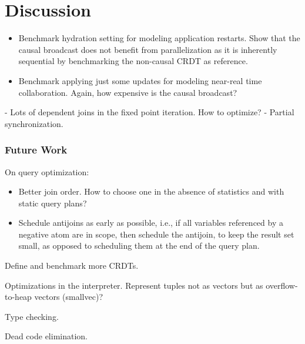 
\chapter{Discussion}\label{ch:discussion}

\begin{itemize}
	\item Benchmark hydration setting for modeling application restarts.
	      Show that the causal broadcast does not benefit from parallelization
	      as it is inherently sequential by benchmarking the non-causal CRDT
	      as reference.
	\item Benchmark applying just some updates for modeling near-real time collaboration.
	      Again, how expensive is the causal broadcast?
\end{itemize}

- Lots of dependent joins in the fixed point iteration. How to optimize?
- Partial synchronization.

\subsection{Future Work}

On query optimization:
\begin{itemize}
	\item Better join order. How to choose one in the absence of statistics
	      and with static query plans?
	\item Schedule antijoins as early as possible, i.e., if all variables
	      referenced by a negative atom are in scope, then schedule the antijoin,
	      to keep the result set small, as opposed to scheduling them at the
	      end of the query plan.
\end{itemize}

Define and benchmark more CRDTs.

Optimizations in the interpreter. Represent tuples not as vectors but
as overflow-to-heap vectors (smallvec)?

Type checking.

Dead code elimination.
